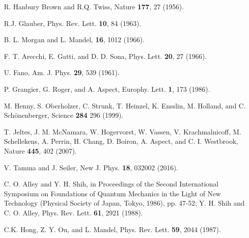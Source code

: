 \documentclass[aps,prl,reprint,showpacs,superscriptaddress]{revtex4-1}
\begin{document}
\begin{thebibliography}{99}

R. Hanbury Brown and R.Q. Twiss, Nature \textbf{177}, 27 (1956).

R.J. Glauber, Phys. Rev. Lett. \textbf{10}, 84 (1963).

B. L. Morgan and L. Mandel, \prl \textbf{16}, 1012 (1966).


F. T. Arecchi, E. Gatti, and D. D. Sona, Phys. Lett. \textbf{20}, 27 (1966).


U. Fano, Am. J. Phys. \textbf{29}, 539 (1961).




P. Grangier, G. Roger, and A. Aspect,  Europhy. Lett. \textbf{1}, 173 (1986).

M. Henny, S. Oberholzer, C. Strunk, T. Heinzel, K. Ensslin, M. Holland, and C. Sch\"{o}nenberger, Science  \textbf{284} 296 (1999).

 
T. Jeltes, J. M. McNamara, W. Hogervorst, W. Vassen, V. Krachmalnicoff, M. Schellekens, A. Perrin, H. Chang, D. Boiron, A. Aspect, and  C. I. Westbrook, Nature \textbf{445}, 402 (2007). 

V. Tamma and J. Seiler, New J.  Phys. \textbf{18}, 032002 (2016).

 C. O. Alley and Y. H. Shih, in Proceedings of the Second International Symposium on Foundations of Quantum Mechanics in the Light of New Technology (Physical Society of Japan, Tokyo, 1986), pp. 47-52; Y. H. Shih
and C. O. Alley, Phys. Rev. Lett. \textbf{61}, 2921 (1988).

C.K. Hong, Z. Y. Ou, and L. Mandel, Phys. Rev. Lett. \textbf{59}, 2044 (1987). 


\end{thebibliography}
\end{document}
